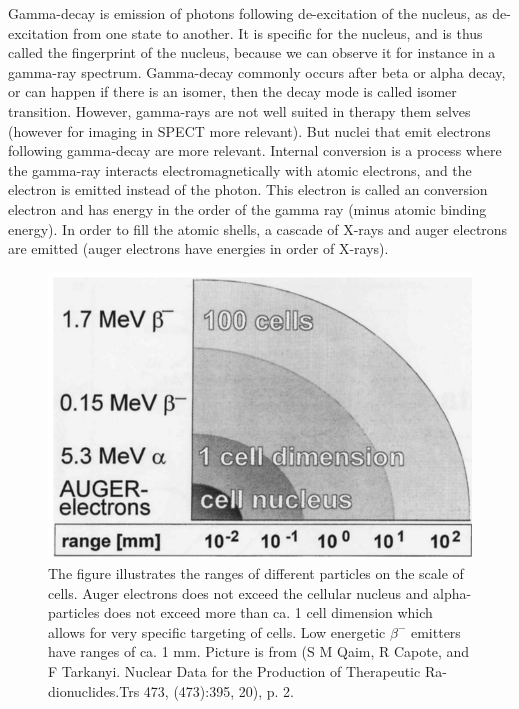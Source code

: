 \documentclass[a4paper,11pt,twoside]{book}
\begin{document}
Gamma-decay is emission of photons following de-excitation of the nucleus, as de-excitation from one state to another. It is specific for the nucleus, and is thus called the fingerprint of the nucleus, because we can observe it for instance in a gamma-ray spectrum. Gamma-decay commonly occurs after beta or alpha decay, or can happen if there is an isomer, then the decay mode is called isomer transition. However, gamma-rays are not well suited in therapy them selves (however for imaging in SPECT more relevant). But nuclei that emit electrons following gamma-decay are more relevant. Internal conversion is a process where the gamma-ray interacts electromagnetically with atomic electrons, and the electron is emitted instead of the photon. This electron is called an conversion electron and has energy in the order of the gamma ray (minus atomic binding energy). In order to fill the atomic shells, a cascade of X-rays and auger electrons are emitted (auger electrons have energies in order of X-rays). 


\begin{figure}
    \centering
    \includegraphics{Theory/cell_dimension.png}
    \caption{The figure illustrates the ranges of different particles on the scale of cells. Auger electrons does not exceed the cellular nucleus and alpha-particles does not exceed more than ca. 1 cell dimension which allows for very specific targeting of cells. Low energetic $\beta^-$ emitters have ranges of ca. 1 mm. Picture is from (S M Qaim, R Capote, and F Tarkanyi.  Nuclear Data for the Production of Therapeutic Ra-dionuclides.Trs 473, (473):395, 20), p. 2. }
    \label{fig:cell_dimension}
\end{figure}
\end{document}
